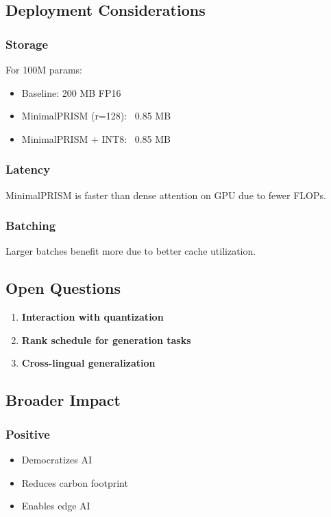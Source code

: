 \subsection{Deployment Considerations}

\subsubsection{Storage}
For 100M params:
\begin{itemize}
\item Baseline: 200 MB FP16
\item MinimalPRISM (r=128): ~0.85 MB
\item MinimalPRISM + INT8: ~0.85 MB

\end{itemize}
\subsubsection{Latency}
MinimalPRISM is faster than dense attention on GPU due to fewer FLOPs.

\subsubsection{Batching}
Larger batches benefit more due to better cache utilization.

\subsection{Open Questions}

\begin{enumerate}
\item \textbf{Interaction with quantization}
\item \textbf{Rank schedule for generation tasks}
\item \textbf{Cross-lingual generalization}

\end{enumerate}
\subsection{Broader Impact}

\subsubsection{Positive}
\begin{itemize}
\item Democratizes AI
\item Reduces carbon footprint
\item Enables edge AI

\end{itemize}
